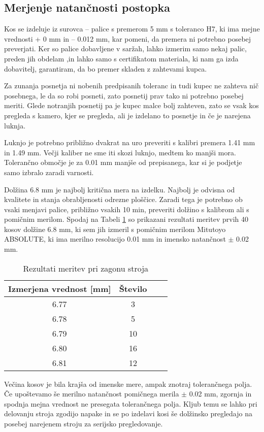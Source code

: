 \subsection{Merjenje natančnosti postopka}
Kos se izdeluje iz surovca -- palice s premerom 5 mm s toleranco
H7, ki ima mejne vrednosti + 0 mm in -- 0.012 mm, kar pomeni,
da premera ni potrebno posebej preverjati. Ker so palice
dobavljene v saržah, lahko izmerim samo nekaj palic, preden
jih obdelam ,in lahko samo s certifikatom materiala, ki nam
ga izda dobavitelj, garantiram, da bo premer skladen z
zahtevami kupca.

Za zunanja posnetja ni nobenih predpisanih toleranc in tudi
kupec ne zahteva nič posebnega, le da so robi posneti, zato posnetij prav tako ni potrebno posebej meriti. Glede notranjih
posnetij pa je kupec malce bolj zahteven, zato se
vsak kos pregleda s kamero, kjer se pregleda, ali je izdelano
to posnetje in če je narejena luknja.

Luknjo je potrebno približno dvakrat na uro preveriti s
kalibri premera 1.41 mm in 1.49 mm. Večji kaliber ne sme iti
skozi luknjo, medtem ko manjši mora. Tolerančno območje je za 0.01 mm
manjše od prepisanega, kar si je podjetje samo izbralo zaradi
varnosti.

Dolžina 6.8 mm je najbolj kritična mera na izdelku.
Najbolj je odvisna od kvalitete in stanja obrabljenosti
odrezne ploščice. Zaradi tega je potrebno ob vsaki menjavi
palice, približno vsakih 10 min, preveriti dolžino s kalibrom
ali s pomičnim merilom. Spodaj na Tabeli \ref{tabela_meritev}
so prikazani rezultati meritev prvih 40 kosov dolžine 6.8 mm,
ki sem jih izmeril s pomičnim merilom Mitutoyo ABSOLUTE,
ki ima merilno resolucijo 0.01 mm in imensko natančnost \(\pm\) 0.02 mm.

\begin{table}[H]
	\caption{Rezultati meritev pri zagonu stroja}
	\label{tabela_meritev}
	\begin{center}
		\begin{tabular}{|c|c|c|c|}
			\hline
			Izmerjena vrednost [mm] & Število \\
			\hline
			6.77                    & 3       \\
			\hline
			6.78                    & 5       \\
			\hline
			6.79                    & 10      \\
			\hline
			6.80                    & 16      \\
			\hline
			6.81                    & 12      \\
			\hline
		\end{tabular}
	\end{center}
\end{table}

Večina kosov je bila krajša od imenske mere, ampak znotraj tolerančnega
polja. Če upoštevamo še merilno natančnost pomičnega merila \(\pm\) 0.02 mm,
zgornja in spodnja mejna vrednost ne presegata tolerančnega polja.
Kljub temu se lahko pri delovanju stroja zgodijo napake
in se po izdelavi kosi še dolžinsko pregledajo na posebej
narejenem stroju za serijsko pregledovanje.